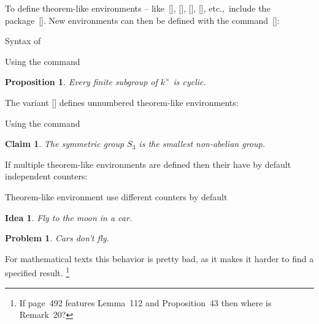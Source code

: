 To define theorem-like environments -- like~[\envname], [\envname], [\envname], [\envname], etc.,\ include the package~[\packname].
New environments can then be defined with the command~[\comname]:
\begin{showcode}{Syntax of }
\newtheorem{internal name of the environment}{name to be printed}
\end{showcode}
\begin{showlatex}{Using the command~}
\newtheorem{proposition}{Proposition}
\begin{proposition}
  Every finite subgroup of $k^\times$ is cyclic.
\end{proposition}
\end{showlatex}
The variant [\comname] defines unnumbered theorem-like environments:
\begin{showlatex}{Using the command~}
\newtheorem*{claim}{Claim}
\begin{claim}
  The symmetric group $S_3$ is the smallest non-abelian group.
\end{claim}
\end{showlatex}

If multiple theorem-like environments are defined then their have by default independent counters:
\begin{showlatex}{Theorem-like environment use different counters by default}
\newtheorem{idea}{Idea}
\newtheorem{problem}{Problem}
\begin{idea}
  Fly to the moon in a car.
\end{idea}
\begin{problem}
  Cars don’t fly.
\end{problem}
\end{showlatex}
For mathematical texts this behavior is pretty bad, as it makes it harder to find a specified result.%
\footnote{If page~492 features Lemma~112 and Proposition~43 then where is Remark~20?}

